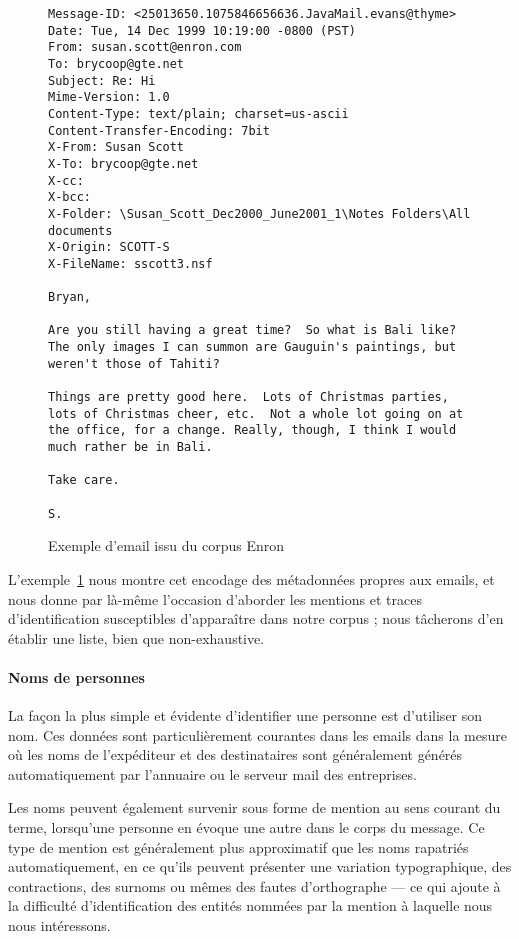 \documentclass[11pt]{article}
\begin{document}
\begin{figure}[H]
\begin{verbatim}
Message-ID: <25013650.1075846656636.JavaMail.evans@thyme>
Date: Tue, 14 Dec 1999 10:19:00 -0800 (PST)
From: susan.scott@enron.com
To: brycoop@gte.net
Subject: Re: Hi
Mime-Version: 1.0
Content-Type: text/plain; charset=us-ascii
Content-Transfer-Encoding: 7bit
X-From: Susan Scott
X-To: brycoop@gte.net
X-cc:
X-bcc:
X-Folder: \Susan_Scott_Dec2000_June2001_1\Notes Folders\All documents
X-Origin: SCOTT-S
X-FileName: sscott3.nsf

Bryan,

Are you still having a great time?  So what is Bali like?
The only images I can summon are Gauguin's paintings, but
weren't those of Tahiti?

Things are pretty good here.  Lots of Christmas parties,
lots of Christmas cheer, etc.  Not a whole lot going on at
the office, for a change. Really, though, I think I would
much rather be in Bali.

Take care.

S.
\end{verbatim}
\caption{Exemple d'email issu du corpus Enron}
\label{fig:emailex}
\end{figure}

L'exemple~\ref{fig:emailex} nous montre cet encodage des métadonnées propres aux
emails, et nous donne par là-même l'occasion d'aborder les mentions et traces
d'identification susceptibles d'apparaître dans notre corpus ; nous tâcherons
d'en établir une liste, bien que non-exhaustive.

\paragraph{Noms de personnes}

La façon la plus simple et évidente d'identifier une personne est d'utiliser son
nom. Ces données sont particulièrement courantes dans les emails dans la mesure
où les noms de l'expéditeur et des destinataires sont généralement générés
automatiquement par l'annuaire ou le serveur mail des entreprises.

Les noms peuvent également survenir sous forme de mention au sens courant du
terme, lorsqu'une personne en évoque une autre dans le corps du message. Ce type
de mention est généralement plus approximatif que les noms rapatriés
automatiquement, en ce qu'ils peuvent présenter une variation typographique, des
contractions, des surnoms ou mêmes des fautes d'orthographe --- ce qui ajoute
à la difficulté d'identification des entités nommées par la mention à laquelle
nous nous intéressons.
\end{document}
